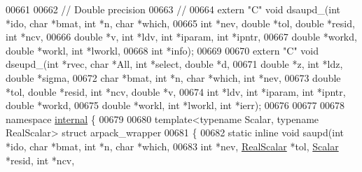 \begin{DoxyCode}
00661 
00662 \textcolor{comment}{// Double precision}
00663 \textcolor{comment}{//}
00664 \textcolor{keyword}{extern} \textcolor{stringliteral}{"C"} \textcolor{keywordtype}{void} dsaupd\_(\textcolor{keywordtype}{int} *ido, \textcolor{keywordtype}{char} *bmat, \textcolor{keywordtype}{int} *n, \textcolor{keywordtype}{char} *which,
00665     \textcolor{keywordtype}{int} *nev, \textcolor{keywordtype}{double} *tol, \textcolor{keywordtype}{double} *resid, \textcolor{keywordtype}{int} *ncv,
00666     \textcolor{keywordtype}{double} *v, \textcolor{keywordtype}{int} *ldv, \textcolor{keywordtype}{int} *iparam, \textcolor{keywordtype}{int} *ipntr,
00667     \textcolor{keywordtype}{double} *workd, \textcolor{keywordtype}{double} *workl, \textcolor{keywordtype}{int} *lworkl,
00668     \textcolor{keywordtype}{int} *info);
00669 
00670 \textcolor{keyword}{extern} \textcolor{stringliteral}{"C"} \textcolor{keywordtype}{void} dseupd\_(\textcolor{keywordtype}{int} *rvec, \textcolor{keywordtype}{char} *All, \textcolor{keywordtype}{int} *select, \textcolor{keywordtype}{double} *d,
00671     \textcolor{keywordtype}{double} *z, \textcolor{keywordtype}{int} *ldz, \textcolor{keywordtype}{double} *sigma, 
00672     \textcolor{keywordtype}{char} *bmat, \textcolor{keywordtype}{int} *n, \textcolor{keywordtype}{char} *which, \textcolor{keywordtype}{int} *nev,
00673     \textcolor{keywordtype}{double} *tol, \textcolor{keywordtype}{double} *resid, \textcolor{keywordtype}{int} *ncv, \textcolor{keywordtype}{double} *v,
00674     \textcolor{keywordtype}{int} *ldv, \textcolor{keywordtype}{int} *iparam, \textcolor{keywordtype}{int} *ipntr, \textcolor{keywordtype}{double} *workd,
00675     \textcolor{keywordtype}{double} *workl, \textcolor{keywordtype}{int} *lworkl, \textcolor{keywordtype}{int} *ierr);
00676 
00677 
00678 \textcolor{keyword}{namespace }\hyperlink{namespaceinternal}{internal} \{
00679 
00680 \textcolor{keyword}{template}<\textcolor{keyword}{typename} Scalar, \textcolor{keyword}{typename} RealScalar> \textcolor{keyword}{struct }arpack\_wrapper
00681 \{
00682   \textcolor{keyword}{static} \textcolor{keyword}{inline} \textcolor{keywordtype}{void} saupd(\textcolor{keywordtype}{int} *ido, \textcolor{keywordtype}{char} *bmat, \textcolor{keywordtype}{int} *n, \textcolor{keywordtype}{char} *which,
00683       \textcolor{keywordtype}{int} *nev, \hyperlink{class_eigen_1_1_arpack_generalized_self_adjoint_eigen_solver_a2555af55e53bf9de894a49e639be2e1e}{RealScalar} *tol, \hyperlink{class_eigen_1_1_arpack_generalized_self_adjoint_eigen_solver_ab1182405bfe87a505d4b7a8311c661ec}{Scalar} *resid, \textcolor{keywordtype}{int} *ncv,

\end{DoxyCode}
